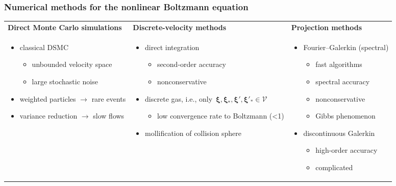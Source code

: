 \documentclass[mathserif]{beamer} %
\newcommand\pro{\item[$+$]}
\newcommand\con{\item[$-$]}
\newcommand{\bxi}{\boldsymbol{\xi}}
\begin{document}
\begin{frame}
    \frametitle{Numerical methods for the nonlinear Boltzmann equation}
    \setlength{\leftmarginii}{10pt}
    \setlength{\leftmarginiii}{\leftmarginii}
    \begin{adjustwidth}{-2.5em}{-2.5em}
    \centering
    \begin{tabular}{p{}p{}p{}}
		\centering\bfseries Direct Monte Carlo simulations &
		\centering\bfseries Discrete-velocity methods &
		{\centering\bfseries Projection methods} \\
		\begin{itemize}
            \item classical DSMC
            \begin{itemize}
                \pro unbounded velocity space
                \con large stochastic noise
            \end{itemize}
            \item weighted particles \(\rightarrow\) rare events
            \item variance reduction \(\rightarrow\) slow flows
        \end{itemize} &
		\begin{itemize}
            \item direct integration
            \begin{itemize}
                \pro second-order accuracy
                \con nonconservative
            \end{itemize}
            \item discrete gas, i.e., only~\(\bxi,\bxi_*,\bxi',\bxi'_*\in\mathcal{V}\)
            \begin{itemize}
                \con low convergence rate to Boltzmann (<1)
            \end{itemize}
            \item \alert{mollification of collision sphere}
        \end{itemize} &
		\begin{itemize}
            \item Fourier--Galerkin (spectral)
            \begin{itemize}
                \pro fast algorithms
                \pro spectral accuracy
                \con nonconservative
                \con Gibbs phenomenon
            \end{itemize}
            \item discontinuous Galerkin
            \begin{itemize}
                \pro high-order accuracy
                \con complicated
            \end{itemize}
        \end{itemize} \\
	\end{tabular}
    \end{adjustwidth}
\end{frame}
\end{document}

